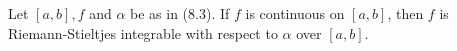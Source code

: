 Let $[a, b], f$ and $\alpha$ be as in (8.3). If $f$ is continuous on $[a, b]$, then $f$ is Riemann-Stieltjes integrable with respect to $\alpha$ over $[a, b]$.